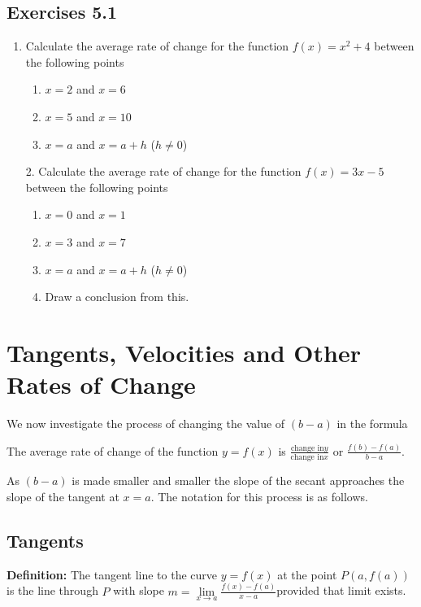 \subsection{Exercises 5.1}
\begin{enumerate}
\item Calculate the average rate of change for the function $f (x) =x^{2} +4$ between the following points 


\begin{enumerate}
\item $x =2$ and $x =6$ 

\item $x =5$ and $x =10$ 

\item $x =a$ and $x =a +h$ ($h \neq 0$) \end{enumerate}


\item [2.]
Calculate the average rate of change for the function $f (x) =3 x -5$ between the following points 


\begin{enumerate}
\item $x =0$ and $x =1$ 

\item $x =3$ and $x =7$ 

\item $x =a$ and $x =a +h$ ($h \neq 0$) 

\item Draw a conclusion from this. \end{enumerate}
\end{enumerate}


\section{Tangents, Velocities and Other Rates of Change}
We now investigate the process of changing the value of $(b -a)$ in the formula 

The average rate of change of the function
$y =f (x)$ is $\frac{\text{change in}y}{\text{change in}x}$ or $\frac{f (b) -f (a)}{b -a}$. 

As $(b -a)$ is made smaller and smaller the slope of the secant approaches the slope of the
tangent at $x =a$. The notation for this process is as follows. 

\subsection{Tangents}
\textbf{Definition:} The tangent line to the curve $y =f (x)$ at the point $P (a ,f (a))$ is the line through $P$ with slope $m =\underset{x \rightarrow a}{\lim }\frac{f (x) -f (a)}{x -a}$provided that limit exists. 

